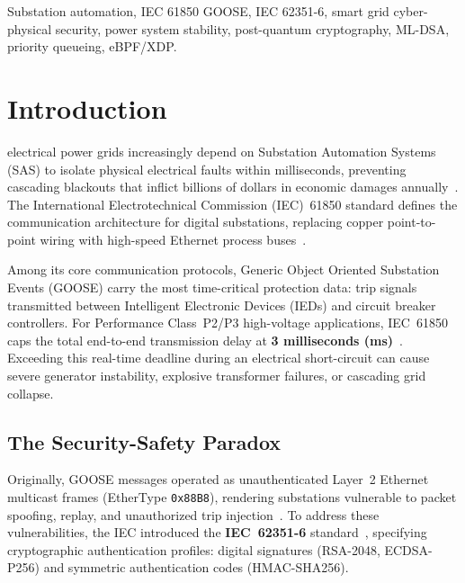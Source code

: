 \documentclass[journal]{IEEEtran}
\begin{document}
\begin{IEEEkeywords}
Substation automation, IEC 61850 GOOSE, IEC 62351-6, smart grid cyber-physical security, power system stability, post-quantum cryptography, ML-DSA, priority queueing, eBPF/XDP.
\end{IEEEkeywords}

\section{Introduction}
\label{sec:intro}
 electrical power grids increasingly depend on Substation Automation Systems (SAS) to isolate physical electrical faults within milliseconds, preventing cascading blackouts that inflict billions of dollars in economic damages annually~\cite{huseinovic2020dos}. The International Electrotechnical Commission (IEC)~61850 standard defines the communication architecture for digital substations, replacing copper point-to-point wiring with high-speed Ethernet process buses~\cite{iec61850}.

Among its core communication protocols, Generic Object Oriented Substation Events (GOOSE) carry the most time-critical protection data: trip signals transmitted between Intelligent Electronic Devices (IEDs) and circuit breaker controllers. For Performance Class~P2/P3 high-voltage applications, IEC~61850 caps the total end-to-end transmission delay at \textbf{3 milliseconds (ms)}~\cite{iec61850}. Exceeding this real-time deadline during an electrical short-circuit can cause severe generator instability, explosive transformer failures, or cascading grid collapse.

\subsection{The Security-Safety Paradox}
Originally, GOOSE messages operated as unauthenticated Layer~2 Ethernet multicast frames (EtherType \texttt{0x88B8}), rendering substations vulnerable to packet spoofing, replay, and unauthorized trip injection~\cite{schuster2017goose, hong2014cyber}. To address these vulnerabilities, the IEC introduced the \textbf{IEC~62351-6} standard~\cite{iec62351}, specifying cryptographic authentication profiles: digital signatures (RSA-2048, ECDSA-P256) and symmetric authentication codes (HMAC-SHA256).
\end{document}
